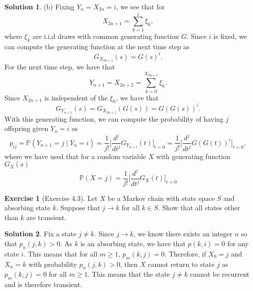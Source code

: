 \documentclass[12pt]{article}
\newcommand{\Prob}{\mathbb{P}}
\theoremstyle{definition}
\newtheorem{exer}{Exercise}
\newtheorem{sol}{Solution}
\theoremstyle{remark}
\begin{document}
\begin{sol}
(b) Fixing $Y_{n} = X_{2n} = i$, we see that for 
\begin{equation*}
X_{2n+1} = \sum_{k=1}^{i} \xi_{k},
\end{equation*}
where $\xi_{k}$ are i.i.d draws with common generating function $G$. Since $i$ is fixed, we can compute the generating function at the next time step as 
\begin{equation}
    G_{X_{2n+1}}(s) = G(s)^{i}.
\end{equation}
For the next time step, we have that
\begin{equation*}
Y_{n+1} = X_{2n+2} = \sum_{k=0}^{X_{2n+1}} \xi_{k}.
\end{equation*}
Since $X_{2n+1}$ is independent of the $\xi_{k}$, we have that 
\begin{equation*}
    G_{Y_{n+1}}(s) = G_{X_{2n+1}}(G(s)) = G(G(s))^{i}.
\end{equation*}
With this generating function, we can compute the probability of having $j$ offspring given $Y_{n} = i$ as 
\begin{equation*}
    p_{ij} = \Prob(Y_{n+1} = j \mid Y_{n} = i) =  \frac{1}{j!}  \Big[ \frac{d^{j}}{dt^{j}}  G_{Y_{n+1}}(t)\Big]_{t=0} = \frac{1}{j!} \Big[ \frac{d^{j}}{dt^{j}}  G(G(t))^{i}\Big]_{t=0}, 
\end{equation*}
where we have used that for a random variable $X$ with generating function $G_{X}(s)$ 
\begin{equation*}
    \Prob(X = j) = \frac{1}{j!} \Big[\frac{d^{j}}{dt^{j}} G_{X}(t)\Big]_{t=0}
\end{equation*}


\end{sol}

\newpage 

\begin{exer}[Exercise 4.3]
    Let $X$ be a Markov chain with state space $S$ and absorbing state $k$. Suppose that $j\rightarrow k$ for all $k\in S$. Show that all states other than $k$ are transient.
\end{exer}

\begin{sol}
Fix a state $j\neq k$. Since $j\rightarrow k$, we know there exists an integer $n$ so that $p_{n}(j,k) > 0$. As $k$ is an absorbing state, we have that $p(k, i) = 0$ for any state $i$. This means that for all $m\geq 1$, $p_{m}(k,j) = 0$. Therefore, if $X_{0} = j$ and $X_{n} = k$ with probability $p_{n}(j,k) > 0$, then $X$ cannot return to state $j$ as $p_{m}(k,j) = 0$ for all $m\geq 1$. This means that the state $j\neq k$ cannot be recurrent and is therefore transient. \end{sol}
\end{document}
